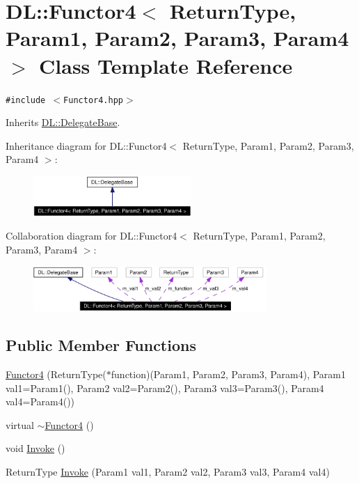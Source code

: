 \hypertarget{classDL_1_1Functor4}{
\section{DL::Functor4$<$ Return\-Type, Param1, Param2, Param3, Param4 $>$ Class Template Reference}
\label{classDL_1_1Functor4}
}
{\tt \#include $<$Functor4.hpp$>$}

Inherits \hyperlink{classDL_1_1DelegateBase}{DL::Delegate\-Base}.

Inheritance diagram for DL::Functor4$<$ Return\-Type, Param1, Param2, Param3, Param4 $>$:\begin{figure}[H]
\begin{center}
\leavevmode
\includegraphics[width=170pt]{classDL_1_1Functor4__inherit__graph}
\end{center}
\end{figure}
Collaboration diagram for DL::Functor4$<$ Return\-Type, Param1, Param2, Param3, Param4 $>$:\begin{figure}[H]
\begin{center}
\leavevmode
\includegraphics[width=252pt]{classDL_1_1Functor4__coll__graph}
\end{center}
\end{figure}
\subsection*{Public Member Functions}
\begin{CompactItemize}
\item 
\hyperlink{classDL_1_1Functor4_a0}{Functor4} (Return\-Type($\ast$function)(Param1, Param2, Param3, Param4), Param1 val1=Param1(), Param2 val2=Param2(), Param3 val3=Param3(), Param4 val4=Param4())
\item 
virtual \hyperlink{classDL_1_1Functor4_a1}{$\sim$Functor4} ()
\item 
void \hyperlink{classDL_1_1Functor4_a2}{Invoke} ()
\item 
Return\-Type \hyperlink{classDL_1_1Functor4_a3}{Invoke} (Param1 val1, Param2 val2, Param3 val3, Param4 val4)
\end{CompactItemize}
